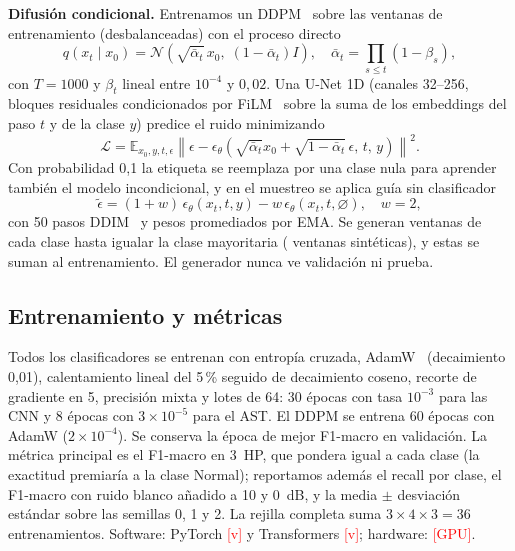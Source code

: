 \documentclass[conference]{IEEEtran}
\newcommand{\pend}[1]{\textcolor{red}{[#1]}}
\providecommand{\HW}{\pend{GPU}}\providecommand{\GPUH}{\pend{h}}
\providecommand{\VTORCH}{\pend{v}}\providecommand{\VTRANSF}{\pend{v}}
\begin{document}
\textbf{Difusión condicional.} Entrenamos un DDPM~\cite{ho2020ddpm} sobre las ventanas de entrenamiento (desbalanceadas) con el proceso directo
\begin{equation}
q(x_t\mid x_0)=\mathcal{N}\!\left(\sqrt{\bar\alpha_t}\,x_0,\;(1-\bar\alpha_t)I\right),\quad \bar\alpha_t=\textstyle\prod_{s\le t}(1-\beta_s),
\end{equation}
con $T=1000$ y $\beta_t$ lineal entre $10^{-4}$ y $0{,}02$. Una U-Net 1D (canales 32--256, bloques residuales condicionados por FiLM~\cite{perez2018film} sobre la suma de los embeddings del paso $t$ y de la clase $y$) predice el ruido minimizando
\begin{equation}
\mathcal{L}=\mathbb{E}_{x_0,y,t,\epsilon}\left\|\epsilon-\epsilon_\theta\!\left(\sqrt{\bar\alpha_t}x_0+\sqrt{1-\bar\alpha_t}\,\epsilon,\,t,\,y\right)\right\|^2 .
\end{equation}
Con probabilidad 0,1 la etiqueta se reemplaza por una clase nula para aprender también el modelo incondicional, y en el muestreo se aplica guía sin clasificador~\cite{ho2022cfg}
\begin{equation}
\tilde\epsilon=(1+w)\,\epsilon_\theta(x_t,t,y)-w\,\epsilon_\theta(x_t,t,\varnothing),\quad w=2,
\end{equation}
con 50 pasos DDIM~\cite{song2021ddim} y pesos promediados por EMA. Se generan ventanas de cada clase hasta igualar la clase mayoritaria (\NSYN{} ventanas sintéticas), y estas se suman al entrenamiento. El generador nunca ve validación ni prueba.

\subsection{Entrenamiento y métricas}
Todos los clasificadores se entrenan con entropía cruzada, AdamW~\cite{loshchilov2019adamw} (decaimiento 0,01), calentamiento lineal del 5\,\% seguido de decaimiento coseno, recorte de gradiente en 5, precisión mixta y lotes de 64: 30 épocas con tasa $10^{-3}$ para las CNN y 8 épocas con $3\times10^{-5}$ para el AST. El DDPM se entrena 60 épocas con AdamW ($2\times10^{-4}$). Se conserva la época de mejor F1-macro en validación. La métrica principal es el F1-macro en 3~HP, que pondera igual a cada clase (la exactitud premiaría a la clase Normal); reportamos además el recall por clase, el F1-macro con ruido blanco añadido a 10 y 0~dB, y la media $\pm$ desviación estándar sobre las semillas 0, 1 y 2. La rejilla completa suma $3\times4\times3=36$ entrenamientos. Software: PyTorch \VTORCH{} y Transformers \VTRANSF{}; hardware: \HW.
\end{document}
